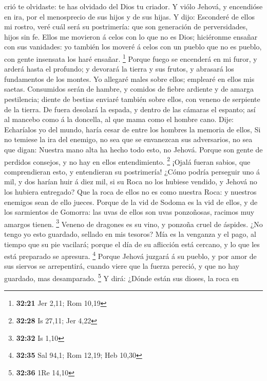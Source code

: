 crió te olvidaste: te has olvidado del Dios tu criador. 
Y viólo Jehová, y encendióse en ira, por el menosprecio de sus hijos y
de sus hijas.  Y dijo: Esconderé de ellos mi rostro, veré
cuál será su postrimería: que son generación de perversidades, hijos sin
fe.  Ellos me movieron á celos con lo que no es Dios;
hiciéronme ensañar con sus vanidades: yo también los moveré á celos con
un pueblo que no es pueblo, con gente insensata los haré ensañar.
\footnote{\textbf{32:21} Jer 2,11; Rom 10,19}  Porque
fuego se encenderá en mi furor, y arderá hasta el profundo; y devorará
la tierra y sus frutos, y abrasará los fundamentos de los montes.
 Yo allegaré males sobre ellos; emplearé en ellos mis
saetas.  Consumidos serán de hambre, y comidos de fiebre
ardiente y de amarga pestilencia; diente de bestias enviaré también
sobre ellos, con veneno de serpiente de la tierra.  De
fuera desolará la espada, y dentro de las cámaras el espanto; así al
mancebo como á la doncella, al que mama como el hombre cano.
 Dije: Echaríalos yo del mundo, haría cesar de entre los
hombres la memoria de ellos,  Si no temiese la ira del
enemigo, no sea que se envanezcan sus adversarios, no sea que digan:
Nuestra mano alta ha hecho todo esto, no Jehová.  Porque
son gente de perdidos consejos, y no hay en ellos entendimiento.
\footnote{\textbf{32:28} Is 27,11; Jer 4,22}  ¡Ojalá
fueran sabios, que comprendieran esto, y entendieran su postrimería!
 ¿Cómo podría perseguir uno á mil, y dos harían huir á
diez mil, si su Roca no los hubiese vendido, y Jehová no los hubiera
entregado?  Que la roca de ellos no es como nuestra Roca:
y nuestros enemigos sean de ello jueces.  Porque de la
vid de Sodoma es la vid de ellos, y de los sarmientos de Gomorra: las
uvas de ellos son uvas ponzoñosas, racimos muy amargos tienen.
\footnote{\textbf{32:32} Is 1,10}  Veneno de dragones es
su vino, y ponzoña cruel de áspides.  ¿No tengo yo esto
guardado, sellado en mis tesoros?  Mía es la venganza y
el pago, al tiempo que su pie vacilará; porque el día de su aflicción
está cercano, y lo que les está preparado se apresura. \footnote{\textbf{32:35}
  Sal 94,1; Rom 12,19; Heb 10,30}  Porque Jehová juzgará
á su pueblo, y por amor de sus siervos se arrepentirá, cuando viere que
la fuerza pereció, y que no hay guardado, mas desamparado. \footnote{\textbf{32:36}
  1Re 14,10}  Y dirá: ¿Dónde están sus dioses, la roca en
